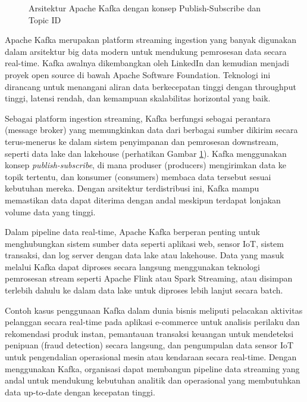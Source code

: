 \begin{figure}[ht]
	\caption{Arsitektur Apache Kafka dengan konsep Publish-Subscribe dan Topic ID}
	\label{fig:kafka-architecture}
\end{figure}


Apache Kafka merupakan platform streaming ingestion yang banyak digunakan dalam arsitektur big data modern untuk mendukung pemrosesan data secara real-time. Kafka awalnya dikembangkan oleh LinkedIn dan kemudian menjadi proyek open source di bawah Apache Software Foundation. Teknologi ini dirancang untuk menangani aliran data berkecepatan tinggi dengan throughput tinggi, latensi rendah, dan kemampuan skalabilitas horizontal yang baik.

Sebagai platform ingestion streaming, Kafka berfungsi sebagai perantara (message broker) yang memungkinkan data dari berbagai sumber dikirim secara terus-menerus ke dalam sistem penyimpanan dan pemrosesan downstream, seperti data lake dan lakehouse (perhatikan Gambar \ref{fig:kafka-architecture}). Kafka menggunakan konsep \textit{publish-subscribe}, di mana produser (producers) mengirimkan data ke topik tertentu, dan konsumer (consumers) membaca data tersebut sesuai kebutuhan mereka. Dengan arsitektur terdistribusi ini, Kafka mampu memastikan data dapat diterima dengan andal meskipun terdapat lonjakan volume data yang tinggi.

Dalam pipeline data real-time, Apache Kafka berperan penting untuk menghubungkan sistem sumber data seperti aplikasi web, sensor IoT, sistem transaksi, dan log server dengan data lake atau lakehouse. Data yang masuk melalui Kafka dapat diproses secara langsung menggunakan teknologi pemrosesan stream seperti Apache Flink atau Spark Streaming, atau disimpan terlebih dahulu ke dalam data lake untuk diproses lebih lanjut secara batch.

Contoh kasus penggunaan Kafka dalam dunia bisnis meliputi pelacakan aktivitas pelanggan secara real-time pada aplikasi e-commerce untuk analisis perilaku dan rekomendasi produk instan, pemantauan transaksi keuangan untuk mendeteksi penipuan (fraud detection) secara langsung, dan pengumpulan data sensor IoT untuk pengendalian operasional mesin atau kendaraan secara real-time. Dengan menggunakan Kafka, organisasi dapat membangun pipeline data streaming yang andal untuk mendukung kebutuhan analitik dan operasional yang membutuhkan data up-to-date dengan kecepatan tinggi.

